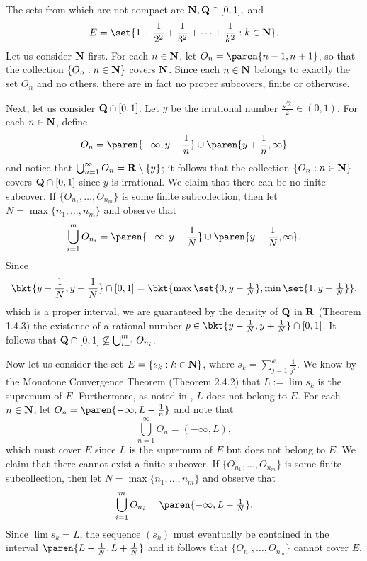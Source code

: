 \documentclass{lew98_solutions}
\begin{document}
\begin{solution}
    The sets from  which are not compact are \( \mathbf{N}, \mathbf{Q} \cap [0, 1], \) and
    \[
        E = \set{ 1 + \frac{1}{2^2} + \frac{1}{3^2} + \cdots + \frac{1}{k^2} : k \in \N }.
    \]
    Let us consider \( \mathbf{N} \) first. For each \( n \in \mathbf{N} \), let \( O_n = \paren{ n - 1, n + 1 } \), so that the collection \( \{ O_n : n \in \mathbf{N} \} \) covers \( \mathbf{N} \). Since each \( n \in \mathbf{N} \) belongs to exactly the set \( O_n \) and no others, there are in fact no proper subcovers, finite or otherwise.

    Next, let us consider \( \mathbf{Q} \cap [0, 1] \). Let \( y \) be the irrational number \( \tfrac{\sqrt{2}}{2} \in (0, 1) \). For each \( n \in \mathbf{N} \), define
    \[
        O_n = \paren{ -\infty, y - \frac{1}{n} } \cup \paren{ y + \frac{1}{n}, \infty }
    \]
    and notice that \( \bigcup_{n=1}^{\infty} O_n = \mathbf{R} \setminus \{ y \} \); it follows that the collection \( \{ O_n : n \in \mathbf{N} \} \) covers \( \mathbf{Q} \cap [0, 1] \) since \( y \) is irrational. We claim that there can be no finite subcover. If \( \{ O_{n_1}, \ldots, O_{n_m} \} \) is some finite subcollection, then let \( N = \max \{ n_1, \ldots, n_m \} \) and observe that
    \[
        \bigcup_{i=1}^m O_{n_i} = \paren{ -\infty, y - \frac{1}{N} } \cup \paren{ y + \frac{1}{N}, \infty }.
    \]
    Since
    \[
        \bkt{ y - \frac{1}{N}, y + \frac{1}{N} } \cap [0, 1] = \bkt{ \max \set{ 0, y - \tfrac{1}{N} }, \min \set{ 1, y + \tfrac{1}{N} } },
    \]
    which is a proper interval, we are guaranteed by the density of \( \mathbf{Q} \) in \( \mathbf{R} \) (Theorem 1.4.3) the existence of a rational number \( p \in \bkt{ y - \tfrac{1}{N}, y + \tfrac{1}{N} } \cap [0, 1] \). It follows that \( \mathbf{Q} \cap [0, 1] \not\subseteq \bigcup_{i=1}^m O_{n_i} \).

    Now let us consider the set \( E = \{ s_k : k \in \mathbf{N} \} \), where \( s_k = \sum_{j=1}^k \tfrac{1}{j^2} \). We know by the Monotone Convergence Theorem (Theorem 2.4.2) that \( L := \lim s_k \) is the supremum of \( E \). Furthermore, as noted in , \( L \) does not belong to \( E \). For each \( n \in \mathbf{N} \), let \( O_n = \paren{ -\infty, L - \tfrac{1}{n} } \) and note that
    \[
        \bigcup_{n=1}^{\infty} O_n = (-\infty, L),
    \]
    which must cover \( E \) since \( L \) is the supremum of \( E \) but does not belong to \( E \). We claim that there cannot exist a finite subcover. If \( \{ O_{n_1}, \ldots, O_{n_m} \} \) is some finite subcollection, then let \( N = \max \{ n_1, \ldots, n_m \} \) and observe that
    \[
        \bigcup_{i=1}^m O_{n_i} = \paren{ -\infty, L - \tfrac{1}{N} }.
    \]
    Since \( \lim s_k = L \), the sequence \( (s_k) \) must eventually be contained in the interval \( \paren{ L - \tfrac{1}{N}, L + \tfrac{1}{N} } \) and it follows that \( \{ O_{n_1}, \ldots, O_{n_m} \} \) cannot cover \( E \).
\end{solution}
\end{document}
